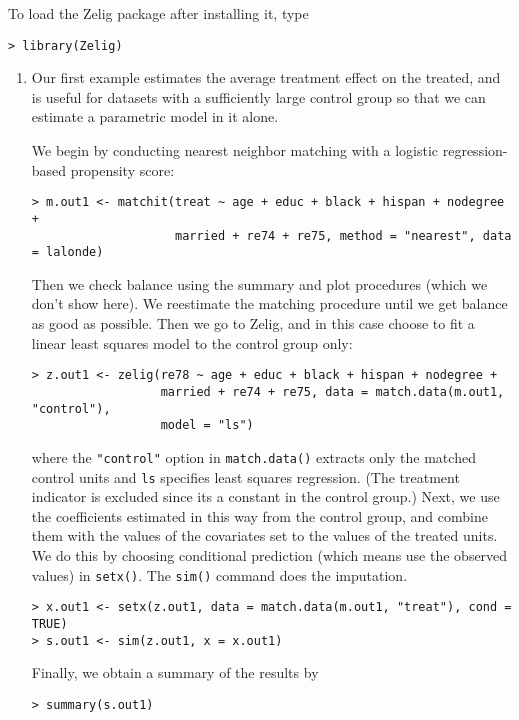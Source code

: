 To load the Zelig package after installing it, type
\begin{verbatim}
> library(Zelig)
\end{verbatim}

\begin{enumerate}
\item Our first example estimates the average treatment effect on the
  treated, and is useful for datasets with a sufficiently large
  control group so that we can estimate a parametric model in it
  alone.

  We begin by conducting nearest neighbor matching with a logistic
  regression-based propensity score:
\begin{verbatim}
> m.out1 <- matchit(treat ~ age + educ + black + hispan + nodegree + 
                    married + re74 + re75, method = "nearest", data = lalonde)
\end{verbatim}
  Then we check balance using the summary and plot procedures (which
  we don't show here).  We reestimate the matching procedure until we
  get balance as good as possible.  Then we go to Zelig, and in this
  case choose to fit a linear least squares model to the control group
  only:
\begin{verbatim}
> z.out1 <- zelig(re78 ~ age + educ + black + hispan + nodegree + 
                  married + re74 + re75, data = match.data(m.out1, "control"), 
                  model = "ls")
\end{verbatim}
  where the {\tt "control"} option in {\tt match.data()} extracts only
  the matched control units and {\tt ls} specifies least squares
  regression.  (The treatment indicator is excluded since its a
  constant in the control group.)  Next, we use the coefficients
  estimated in this way from the control group, and combine them with
  the values of the covariates set to the values of the treated units.
  We do this by choosing conditional prediction (which means use the
  observed values) in \texttt{setx()}.  The {\tt sim()} command does
  the imputation.
\begin{verbatim}
> x.out1 <- setx(z.out1, data = match.data(m.out1, "treat"), cond = TRUE)
> s.out1 <- sim(z.out1, x = x.out1)
\end{verbatim}
Finally, we obtain a summary of the results by 
\begin{verbatim}
> summary(s.out1)
\end{verbatim}


\end{enumerate}

